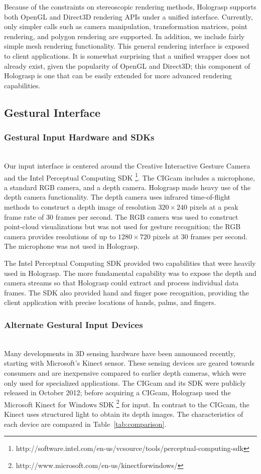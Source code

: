 \documentclass[pageno]{jpaper}
\begin{document}
Because of the constraints on stereoscopic rendering methods, Holograsp supports both OpenGL and Direct3D rendering APIs under a unified interface.
Currently, only simpler calls such as camera manipulation, transformation matrices, point rendering, and polygon rendering are supported. In addition,
we include fairly simple mesh rendering functionality. This general rendering interface is exposed to client applications. It is somewhat surprising that
a unified wrapper does not already exist, given the popularity of OpenGL and Direct3D; this component of Holograsp is one that can be easily extended for
more advanced rendering capabilities.

\subsection{Gestural Interface}
\subsubsection{Gestural Input Hardware and SDKs} $ $\\
Our input interface is centered around the Creative Interactive Gesture Camera and the Intel Perceptual Computing SDK 
\footnote{http://software.intel.com/en-us/vcsource/tools/perceptual-computing-sdk}.
The CIGcam includes a microphone, a standard RGB camera, and a depth camera. Holograsp made heavy use of the depth camera functionality. 
The depth camera uses infrared time-of-flight methods to construct a depth image of resolution $320 \times 240$ pixels at a peak frame
rate of 30 frames per second. The RGB camera was used to construct point-cloud visualizations but was not used for gesture recognition;
the RGB camera provides resolutions of up to $1280 \times 720$ pixels at 30 frames per second. The microphone was not used in Holograsp.

The Intel Perceptual Computing SDK provided two capabilities that were heavily used in Holograsp. The more fundamental capability was
to expose the depth and camera streams so that Holograsp could extract and process individual data frames. The SDK also provided
hand and finger pose recognition, providing the client application with precise locations of hands, palms, and fingers. 

\subsubsection{Alternate Gestural Input Devices}$ $\\
Many developments in 3D sensing hardware have been announced recently, starting with Microsoft's Kinect sensor. These sensing
devices are geared towards consumers and are inexpensive compared to earlier depth cameras, which were only used for specialized applications.
The CIGcam and its SDK were publicly released in October 2012; before acquiring a CIGcam, Holograsp used the Microsoft Kinect for Windows SDK 
\footnote{http://www.microsoft.com/en-us/kinectforwindows/} for input. In contrast to the CIGcam, the Kinect uses structured light
to obtain its depth images. The characteristics of each device are compared in Table~\ref{tab:comparison}.
\end{document}
